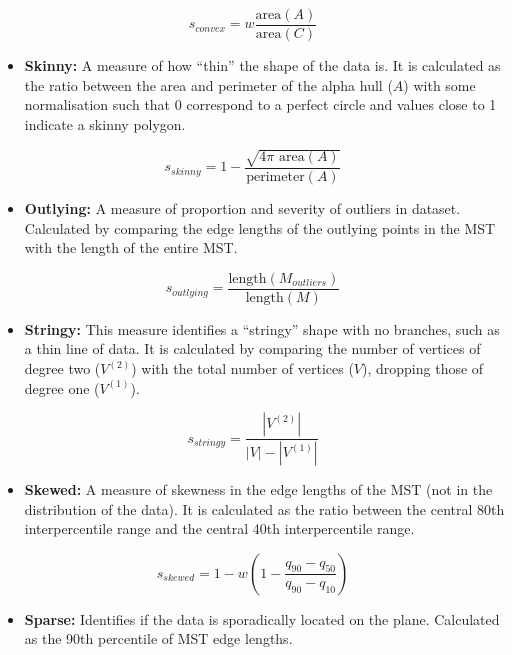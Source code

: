 \[s_{convex}=w\frac{\mbox{area}(A)}{\mbox{area}(C)}\]

\begin{itemize}
\tightlist
\item
  \textbf{Skinny:} A measure of how ``thin'' the shape of the data is.
  It is calculated as the ratio between the area and perimeter of the
  alpha hull (\(A\)) with some normalisation such that 0 correspond to a
  perfect circle and values close to 1 indicate a skinny polygon.
\end{itemize}

\[s_{skinny}= 1-\frac{\sqrt{4\pi \mbox{ area}(A)}}{\mbox{perimeter}(A)}\]

\begin{itemize}
\tightlist
\item
  \textbf{Outlying:} A measure of proportion and severity of outliers in
  dataset. Calculated by comparing the edge lengths of the outlying
  points in the MST with the length of the entire MST.
\end{itemize}

\[s_{outlying}=\frac{\mbox{length}(M_{outliers})}{\mbox{length}(M)}\]

\begin{itemize}
\tightlist
\item
  \textbf{Stringy:} This measure identifies a ``stringy'' shape with no
  branches, such as a thin line of data. It is calculated by comparing
  the number of vertices of degree two (\(V^{(2)}\)) with the total
  number of vertices (\(V\)), dropping those of degree one
  (\(V^{(1)}\)).
\end{itemize}

\[s_{stringy} = \frac{|V^{(2)}|}{|V|-|V^{(1)}|}\]

\begin{itemize}
\tightlist
\item
  \textbf{Skewed:} A measure of skewness in the edge lengths of the MST
  (not in the distribution of the data). It is calculated as the ratio
  between the central 80th interpercentile range and the central 40th
  interpercentile range.
\end{itemize}

\[s_{skewed} = 1-w\left(1-\frac{q_{90}-{q_{50}}}{q_{90}-q_{10}}\right)\]

\begin{itemize}
\tightlist
\item
  \textbf{Sparse:} Identifies if the data is sporadically located on the
  plane. Calculated as the 90th percentile of MST edge lengths.
\end{itemize}

